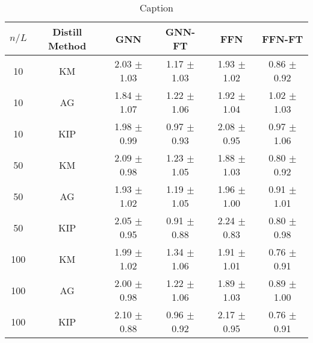 \begin{table*}[]
	\centering
	{\small
	\begin{tabular}{cccccc}
		\toprule
		\textbf{$n/L$} & \textbf{Distill Method} & \textbf{GNN} & \textbf{GNN-FT} & \textbf{FFN} & \textbf{FFN-FT}\\ \midrule
		10 & KM & 2.03 $\pm$ 1.03 & 1.17 $\pm$ 1.03 & 1.93 $\pm$ 1.02 & 0.86 $\pm$ 0.92\\
		10 & AG & 1.84 $\pm$ 1.07 & 1.22 $\pm$ 1.06 & 1.92 $\pm$ 1.04 & 1.02 $\pm$ 1.03\\
		10 & KIP & 1.98 $\pm$ 0.99 & 0.97 $\pm$ 0.93 & 2.08 $\pm$ 0.95 & 0.97 $\pm$ 1.06\\
		50 & KM & 2.09 $\pm$ 0.98 & 1.23 $\pm$ 1.05 & 1.88 $\pm$ 1.03 & 0.80 $\pm$ 0.92\\
		50 & AG & 1.93 $\pm$ 1.02 & 1.19 $\pm$ 1.05 & 1.96 $\pm$ 1.00 & 0.91 $\pm$ 1.01\\
		50 & KIP & 2.05 $\pm$ 0.95 & 0.91 $\pm$ 0.88 & 2.24 $\pm$ 0.83 & 0.80 $\pm$ 0.98\\
		100 & KM & 1.99 $\pm$ 1.02 & 1.34 $\pm$ 1.06 & 1.91 $\pm$ 1.01 & 0.76 $\pm$ 0.91\\
		100 & AG & 2.00 $\pm$ 0.98 & 1.22 $\pm$ 1.06 & 1.89 $\pm$ 1.03 & 0.89 $\pm$ 1.00\\
		100 & KIP & 2.10 $\pm$ 0.88 & 0.96 $\pm$ 0.92 & 2.17 $\pm$ 0.95 & 0.76 $\pm$ 0.91\\
		\bottomrule
	\end{tabular}
	}
	\caption{Caption}
	\label{my_label}
\end{table*}
